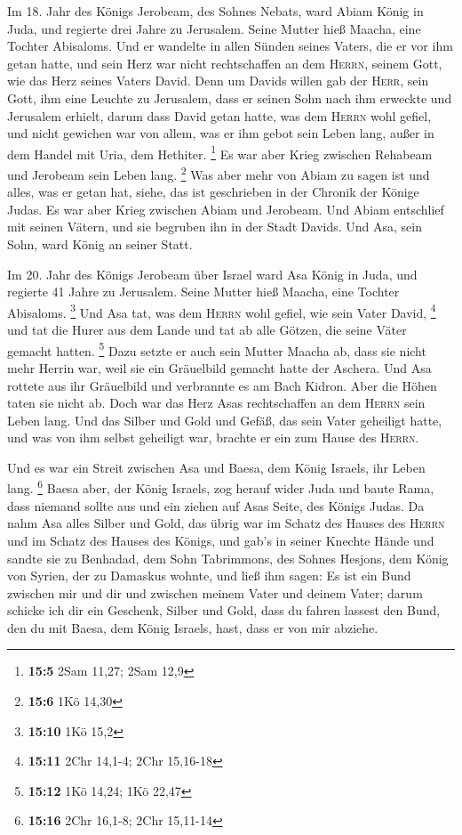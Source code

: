  Im 18. Jahr des Königs Jerobeam, des Sohnes Nebats, ward
Abiam König in Juda,  und regierte drei Jahre zu
Jerusalem. Seine Mutter hieß Maacha, eine Tochter Abisaloms.
 Und er wandelte in allen Sünden seines Vaters, die er vor
ihm getan hatte, und sein Herz war nicht rechtschaffen an dem
\textsc{Herrn}, seinem Gott, wie das Herz seines Vaters David.
 Denn um Davids willen gab der \textsc{Herr}, sein Gott,
ihm eine Leuchte zu Jerusalem, dass er seinen Sohn nach ihm erweckte und
Jerusalem erhielt,  darum dass David getan hatte, was dem
\textsc{Herrn} wohl gefiel, und nicht gewichen war von allem, was er ihm
gebot sein Leben lang, außer in dem Handel mit Uria, dem Hethiter.
\footnote{\textbf{15:5} 2Sam 11,27; 2Sam 12,9}  Es war
aber Krieg zwischen Rehabeam und Jerobeam sein Leben lang. \footnote{\textbf{15:6}
  1Kö 14,30}  Was aber mehr von Abiam zu sagen ist und
alles, was er getan hat, siehe, das ist geschrieben in der Chronik der
Könige Judas. Es war aber Krieg zwischen Abiam und Jerobeam.
 Und Abiam entschlief mit seinen Vätern, und sie begruben
ihn in der Stadt Davids. Und Asa, sein Sohn, ward König an seiner Statt.

 Im 20. Jahr des Königs Jerobeam über Israel ward Asa
König in Juda,  und regierte 41 Jahre zu Jerusalem. Seine
Mutter hieß Maacha, eine Tochter Abisaloms. \footnote{\textbf{15:10} 1Kö
  15,2}  Und Asa tat, was dem \textsc{Herrn} wohl gefiel,
wie sein Vater David, \footnote{\textbf{15:11} 2Chr 14,1-4; 2Chr
  15,16-18}  und tat die Hurer aus dem Lande und tat ab
alle Götzen, die seine Väter gemacht hatten. \footnote{\textbf{15:12}
  1Kö 14,24; 1Kö 22,47}  Dazu setzte er auch sein Mutter
Maacha ab, dass sie nicht mehr Herrin war, weil sie ein Gräuelbild
gemacht hatte der Aschera. Und Asa rottete aus ihr Gräuelbild und
verbrannte es am Bach Kidron.  Aber die Höhen taten sie
nicht ab. Doch war das Herz Asas rechtschaffen an dem \textsc{Herrn}
sein Leben lang.  Und das Silber und Gold und Gefäß, das
sein Vater geheiligt hatte, und was von ihm selbst geheiligt war,
brachte er ein zum Hause des \textsc{Herrn}.

 Und es war ein Streit zwischen Asa und Baesa, dem König
Israels, ihr Leben lang. \footnote{\textbf{15:16} 2Chr 16,1-8; 2Chr
  15,11-14}  Baesa aber, der König Israels, zog herauf
wider Juda und baute Rama, dass niemand sollte aus und ein ziehen auf
Asas Seite, des Königs Judas.  Da nahm Asa alles Silber
und Gold, das übrig war im Schatz des Hauses des \textsc{Herrn} und im
Schatz des Hauses des Königs, und gab's in seiner Knechte Hände und
sandte sie zu Benhadad, dem Sohn Tabrimmons, des Sohnes Hesjons, dem
König von Syrien, der zu Damaskus wohnte, und ließ ihm sagen:
 Es ist ein Bund zwischen mir und dir und zwischen meinem
Vater und deinem Vater; darum schicke ich dir ein Geschenk, Silber und
Gold, dass du fahren lassest den Bund, den du mit Baesa, dem König
Israels, hast, dass er von mir abziehe.


